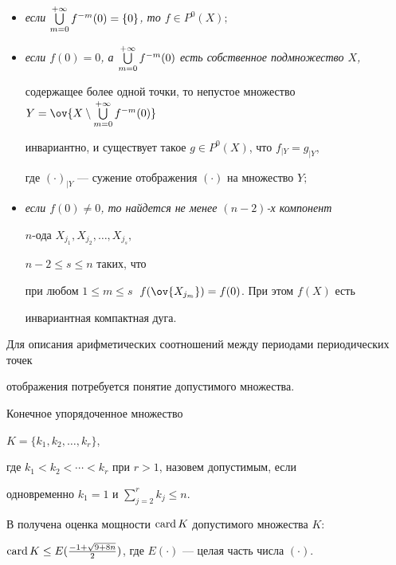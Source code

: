\begin{itemize}


\item[(A1)] {\it если $\bigcup\limits_{m=0}^{+\infty}f^{-m}(0) =\{0\}$, то $f\in P^0(X);$}


\item[(A2)] {\it если $f(0)=0$, а $\bigcup\limits_{m=0}^{+\infty}f^{-m}(0)$ есть собственное подмножество $X$,


содержащее более одной точки, то непустое множество $Y=\ov{X\setminus \ty}$


инвариантно, и существует такое $g\in P^0(X)$, что $f_{\mid Y}=g_{\mid Y}$,


где $(\cdot)_{\mid Y}$ --- сужение отображения $(\cdot)$ на множество $Y;$}


\item[(A3)] {\it если $f(0)\ne 0$, то найдется не менее $(n-2)$-х компонент


$n$-ода $X_{j_1}, X_{j_2},\dotsc, X_{j_s},$ \linebreak


$n-2\le s\le n$ таких, что


при любом $1\le m\le s\;$ $f(\ov{X_{j_m}})=f(0)$. При этом $f(X)$ есть


инвариантная компактная дуга.}


\end{itemize}


\medskip





Для описания арифметических соотношений между периодами периодических точек


отображения \fm потребуется понятие допустимого множества.





\begin{defn} Конечное упорядоченное множество


$K=\{k_1,k_2,\dotsc,k_r\}$,


где $k_1<k_2<\dotsb<k_r$ при $r>1$, назовем допустимым, если


одновременно $k_1=1$ и $\sum\limits_{j=2}^{r}k_j\le n$.


\end{defn}





В \cite{Efr} получена оценка мощности $\operatorname{card} K$ допустимого множества $K$:


$\card K\le


E(\frac{-1+\sqrt{9+8n}}{2})$, где $E(\cdot)$ --- целая часть числа $(\cdot)$.


